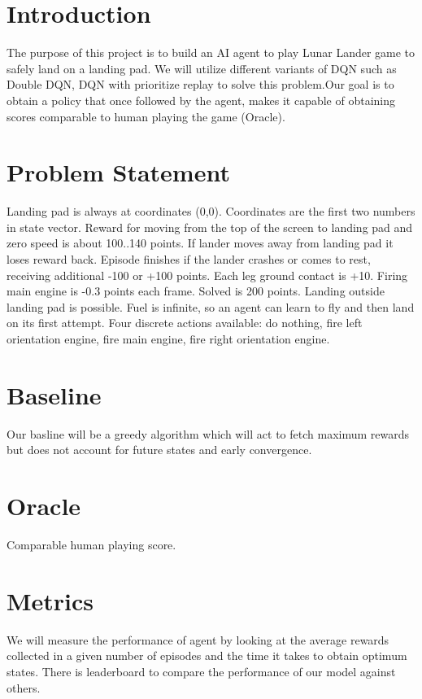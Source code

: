 \documentclass[12pt]{article}
\begin{document}


\section{Introduction}

The purpose of this project is to build an AI agent to play Lunar Lander game to safely land on a landing pad. We will utilize different variants of DQN such as Double DQN, DQN with prioritize replay to solve this problem.Our goal is to obtain a policy that once followed by the agent, makes it capable of obtaining scores comparable to human playing  the game  (Oracle).

\section{Problem Statement}
Landing pad is always at coordinates (0,0). Coordinates are the first two numbers in state vector. Reward for moving from the top of the screen to landing pad and zero speed is about 100..140 points. If lander moves away from landing pad it loses reward back. Episode finishes if the lander crashes or comes to rest, receiving additional -100 or +100 points. Each leg ground contact is +10. Firing main engine is -0.3 points each frame. Solved is 200 points. Landing outside landing pad is possible. Fuel is infinite, so an agent can learn to fly and then land on its first attempt. Four discrete actions available: do nothing, fire left orientation engine, fire main engine, fire right orientation engine.

\section{Baseline}
Our basline will be a greedy algorithm which will act to  fetch maximum rewards but does not account for future states and early convergence.

\section{Oracle}

Comparable human playing score.

\section{Metrics}
We will measure the performance of agent by looking at the average rewards collected in a given number of episodes and the time it takes to obtain optimum states. There is leaderboard to compare the performance of our model against others.
\end{document}
